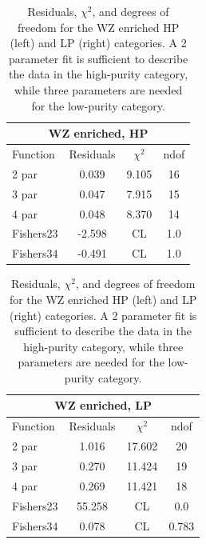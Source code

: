 \begin{table}[htb]
\centering
\begin{tabular}{|l c c c |}
\hline
\multicolumn{4}{|c|}{WZ enriched, HP}\\
\hline
Function & Residuals & $\chi^2$ & ndof \\
\hline
2 par & 0.039 & 9.105 & 16 \\
3 par & 0.047 & 7.915 & 15 \\
4 par & 0.048 & 8.370 & 14 \\
\hline
\hline
Fishers23 & -2.598& CL & 1.0\\
Fishers34 & -0.491& CL & 1.0\\
\hline
\end{tabular}
\quad
\begin{tabular}{|l c c c |}
\hline
\multicolumn{4}{|c|}{WZ enriched, LP}\\
\hline
Function & Residuals & $\chi^2$ & ndof \\
\hline
2 par & 1.016 & 17.602 & 20 \\
3 par & 0.270 & 11.424 & 19 \\
4 par & 0.269 & 11.421 & 18 \\
\hline
\hline
Fishers23 & 55.258& CL & 0.0\\
Fishers34 & 0.078& CL & 0.783\\
\hline
\end{tabular}
\caption{Residuals, $\chi^{2}$, and degrees of freedom for the WZ enriched HP (left) and LP (right) categories. A 2 parameter fit is sufficient to describe the data in the high-purity category, while three parameters are needed for the low-purity category.}
\label{tab:WZ_enriched}
\end{table}



